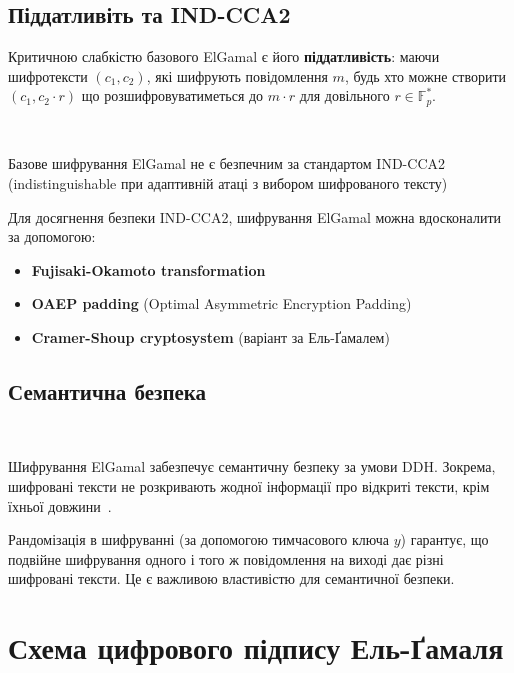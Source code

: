 \subsection{Піддатливіть та IND-CCA2}

Критичною слабкістю базового ElGamal є його \textbf{піддатливість}: маючи шифротексти $(c_1, c_2)$, які шифрують 
повідомлення $m$, будь хто можне створити $(c_1, c_2 \cdot r)$ що розшифровуватиметься до $m \cdot r$ для 
довільного $r \in \mathbb{F}_p^*$.

\begin{proposition}
    ~\par Базове шифрування ElGamal не є безпечним за стандартом IND-CCA2 (indistinguishable при адаптивній атаці з вибором шифрованого тексту)
\end{proposition}

Для досягнення безпеки IND-CCA2, шифрування ElGamal можна вдосконалити за допомогою:
\begin{itemize}
    \item \textbf{Fujisaki-Okamoto transformation}~\cite{fujisaki1999secure}
    \item \textbf{OAEP padding} (Optimal Asymmetric Encryption Padding)~\cite{bellare1994optimal}
    \item \textbf{Cramer-Shoup cryptosystem} (варіант за Ель-Ґамалем)~\cite{cramer1998practical}
\end{itemize}

\subsection{Семантична безпека}

\begin{theorem}
    ~\par Шифрування ElGamal забезпечує семантичну безпеку за умови DDH. Зокрема, шифровані тексти не розкривають жодної 
    інформації про відкриті тексти, крім їхньої довжини~\cite{goldwasser1984probabilistic}.
\end{theorem}

Рандомізація в шифруванні (за допомогою тимчасового ключа $y$) гарантує, що подвійне шифрування одного і того ж 
повідомлення на виході дає різні шифровані тексти. Це є важливою властивістю для семантичної безпеки.

\section{Схема цифрового підпису Ель-Ґамаля}

